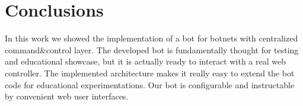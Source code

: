 \section{Conclusions}
\label{sec:conclusions}

In this work we showed the implementation of a bot for botnets with centralized command\&control layer. The developed bot is fundamentally thought for testing and educational showcase, but it is actually ready to interact with a real web controller.
The implemented architecture makes it really easy to extend the bot code for educational experimentations.
Our bot is configurable and instructable by convenient web user interfaces.
